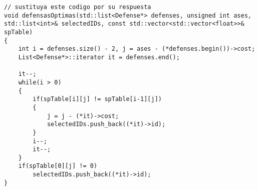 \begin{lstlisting}
// sustituya este codigo por su respuesta
void defensasOptimas(std::list<Defense*> defenses, unsigned int ases, std::list<int>& selectedIDs, const std::vector<std::vector<float>>& spTable)
{
    int i = defenses.size() - 2, j = ases - (*defenses.begin())->cost;
    List<Defense*>::iterator it = defenses.end();

    it--;
    while(i > 0)
    {
        if(spTable[i][j] != spTable[i-1][j])
        {
            j = j - (*it)->cost;
            selectedIDs.push_back((*it)->id);
        }
        i--;
        it--;
    }
    if(spTable[0][j] != 0)
        selectedIDs.push_back((*it)->id);
}
\end{lstlisting}